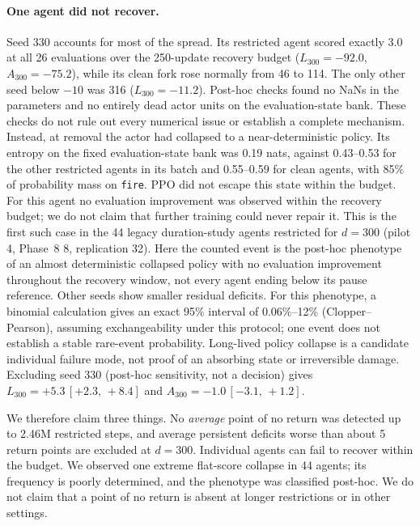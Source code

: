 \documentclass[10pt]{article} %
\newcommand{\ci}[2]{\,[#1,\,#2]}
\begin{document}
\paragraph{One agent did not recover.} Seed 330 accounts for most of the spread. Its restricted agent scored exactly 3.0 at all 26 evaluations over the 250-update recovery budget ($L_{300}=-92.0$, $A_{300}=-75.2$), while its clean fork rose normally from 46 to 114. The only other seed below $-10$ was 316 ($L_{300}=-11.2$). Post-hoc checks found no NaNs in the parameters and no entirely dead actor units on the evaluation-state bank. These checks do not rule out every numerical issue or establish a complete mechanism. Instead, at removal the actor had collapsed to a near-deterministic policy. Its entropy on the fixed evaluation-state bank was 0.19 nats, against 0.43--0.53 for the other restricted agents in its batch and 0.55--0.59 for clean agents, with 85\% of probability mass on \texttt{fire}. PPO did not escape this state within the budget. For this agent no evaluation improvement was observed within the recovery budget; we do not claim that further training could never repair it. This is the first such case in the 44 legacy duration-study agents restricted for $d=300$ (pilot 4, Phase~8 8, replication 32). Here the counted event is the post-hoc phenotype of an almost deterministic collapsed policy with no evaluation improvement throughout the recovery window, not every agent ending below its pause reference. Other seeds show smaller residual deficits. For this phenotype, a binomial calculation gives an exact 95\% interval of 0.06\%--12\% (Clopper--Pearson), assuming exchangeability under this protocol; one event does not establish a stable rare-event probability. Long-lived policy collapse is a candidate individual failure mode, not proof of an absorbing state or irreversible damage. Excluding seed 330 (post-hoc sensitivity, not a decision) gives $L_{300}=+5.3\ci{+2.3}{+8.4}$ and $A_{300}=-1.0\ci{-3.1}{+1.2}$.

We therefore claim three things. No \emph{average} point of no return was detected up to 2.46M restricted steps, and average persistent deficits worse than about 5 return points are excluded at $d=300$. Individual agents can fail to recover within the budget. We observed one extreme flat-score collapse in 44 agents; its frequency is poorly determined, and the phenotype was classified post-hoc. We do not claim that a point of no return is absent at longer restrictions or in other settings.
\end{document}
